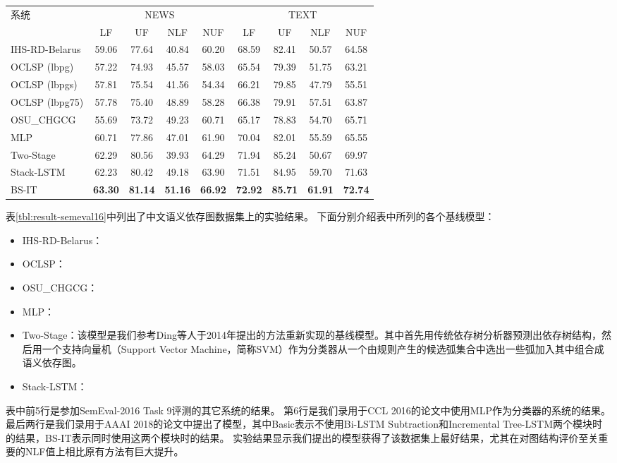 \begin{table}[htpb]
	\centering
	\small
	\renewcommand{\arraystretch}{1.2}
	\begin{tabular}{l|cccc|cccc}
		\hline
		\multirow{2}{*}{ 系统}&\multicolumn{4}{c}{NEWS}&\multicolumn{4}{c}{TEXT}\\
		\cline{2-9}
		& LF& UF& NLF& NUF& LF& UF& NLF& NUF\\
		\hline
		IHS-RD-Belarus&59.06&77.64&40.84&60.20&68.59&82.41&50.57&64.58\\
		OCLSP (lbpg)&57.22&74.93&45.57&58.03&65.54&79.39&51.75&63.21\\
		OCLSP (lbpgs)&57.81&75.54&41.56&54.34&66.21&79.85&47.79&55.51\\
		OCLSP (lbpg75)&57.78&75.40&48.89&58.28&66.38&79.91&57.51&63.87\\
		OSU\_CHGCG&55.69&73.72&49.23&60.71&65.17&78.83&54.70&65.71\\
		MLP & 60.71&77.86&47.01&61.90&70.04&82.01&55.59&65.55 \\ 
		Two-Stage & 62.29&80.56&39.93&64.29&71.94&85.24&50.67&69.97 \\ 
		Stack-LSTM &62.23&80.42&49.18&63.90&71.51&84.95&59.70&71.63\\
		BS-IT &\bf63.30&\bf81.14&\bf51.16&\bf66.92&\bf72.92&\bf85.71&\bf61.91&\bf72.74\\
		\hline
	\end{tabular}
\end{table}

表\ref{tbl:result-semeval16}中列出了中文语义依存图数据集上的实验结果。
下面分别介绍表中所列的各个基线模型：
\begin{itemize}
    \item IHS-RD-Belarus：
    \item OCLSP：
    \item OSU\_CHGCG：
    \item MLP：
    \item Two-Stage：该模型是我们参考Ding等人\cite{ding-etal-2014-dependency}于2014年提出的方法重新实现的基线模型。其中首先用传统依存树分析器预测出依存树结构，然后用一个支持向量机（Support Vector Machine，简称SVM）作为分类器从一个由规则产生的候选弧集合中选出一些弧加入其中组合成语义依存图。
    \item Stack-LSTM：
\end{itemize}

表中前5行是参加SemEval-2016 Task 9评测的其它系统的结果。
第6行是我们录用于CCL 2016的论文中使用MLP作为分类器的系统的结果。
最后两行是我们录用于AAAI 2018的论文中提出了模型，其中Basic表示不使用Bi-LSTM Subtraction和Incremental Tree-LSTM两个模块时的结果，BS-IT表示同时使用这两个模块时的结果。
实验结果显示我们提出的模型获得了该数据集上最好结果，尤其在对图结构评价至关重要的NLF值上相比原有方法有巨大提升。

